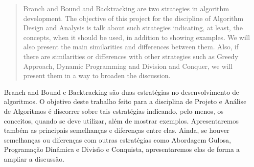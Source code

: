 
\begin{abstract}
    Branch and Bound and Backtracking are two strategies in algorithm development.
    The objective of this project for the discipline of Algorithm Design and Analysis is
    talk about such strategies indicating, at least, the concepts, when it should be
    used, in addition to showing examples. We will also present the main similarities
    and differences between them. Also, if there are similarities or differences with other strategies such as
    Greedy Approach, Dynamic Programming and Division and Conquer, we will present them in a way
    to broaden the discussion.
  \end{abstract}
       
  \begin{resumo} 
    Branch and Bound e Backtracking são duas estratégias no desenvolvimento de algoritmos. 
    O objetivo deste trabalho feito para a disciplina de Projeto e Análise de Algoritmos é 
    discorrer sobre tais estratégias indicando, pelo menos, os conceitos, quando se deve 
    utilizar, além de mostrar exemplos. Apresentaremos também as principais semelhanças 
    e diferenças entre elas. Ainda, se houver semelhanças ou diferenças com outras estratégias como
    Abordagem Gulosa, Programação Dinâmica e Divisão e Conquista, apresentaremos elas de forma 
    a ampliar a discussão.
  \end{resumo}
  